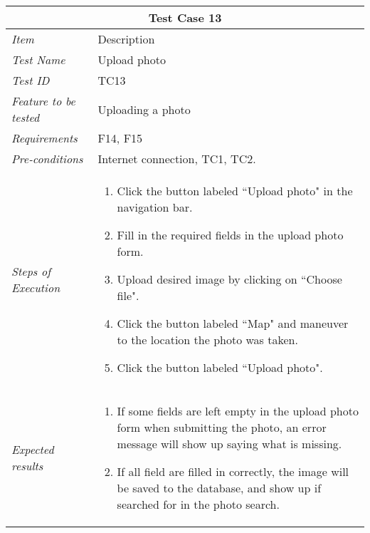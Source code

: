 \begin{minipage}{\linewidth}
\setlength{\tabcolsep}{15pt}
\centering
{}
\begin{tabular}{ |l|p{70mm}| }
	\hline
	\multicolumn{2}{|c|}{\cellcolor{gray!25} \textbf{Test Case 13}} \\
	\hline
	\it{\cellcolor{gray!25}Item} & {\cellcolor{gray!25} Description } \\
	\hline
	\it{\cellcolor{gray!25}Test Name } & Upload photo \\ \hline
	\it{\cellcolor{gray!25}Test ID} & TC13 \\ \hline
	\it{\cellcolor{gray!25}Feature to be tested} & Uploading a photo \\ \hline
	\it{\cellcolor{gray!25}Requirements} & F14, F15  \\ \hline
	\it{\cellcolor{gray!25}Pre-conditions} & Internet connection, TC1, TC2. \\ \hline
	\it{\cellcolor{gray!25}Steps of Execution} & \begin{enumerate}
	                                       \item Click the button labeled ``Upload photo" in the navigation bar.
	                                       \item Fill in the required fields in the upload photo form.
	                                       \item Upload desired image by clicking on ``Choose file".
	                                       \item Click the button labeled ``Map" and maneuver to the location the photo was taken.
	                                       \item Click the button labeled ``Upload photo".
	                                     \end{enumerate} \\ \hline
	\it{\cellcolor{gray!25}Expected results} & \begin{enumerate}[label=\alph*)]
	                                       \item If some fields are left empty in the upload photo form when submitting the photo, an error message will show up saying what is missing.
	                                       \item If all field are filled in correctly, the image will be saved to the database, and show up if searched for in the photo search.
	                                     \end{enumerate} \\
	\hline
\end{tabular}
\medskip
\end{minipage}
